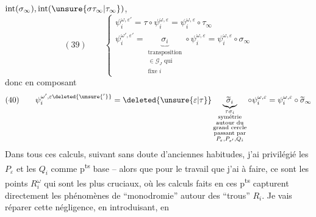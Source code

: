 $\operatorname{int}(\sigma_\infty),\operatorname{int}(\unsure{\sigma\tau_\infty|\tau_\infty})$,
\[
(39)\qquad\begin{cases}
\psi_i^{\omega,\varepsilon'}=\tau\circ\psi_i^{\omega,\varepsilon}=\psi_i^{\omega,\varepsilon}\circ\tau_\infty\\[5pt]
\psi_i^{\omega',\varepsilon'}=\underbrace{\sigma_i}_{\substack{\text{transposition}\\\in\mathcal G_J\text{ qui}\\\text{fixe }i}}\circ\psi_i^{\omega,\varepsilon}=\psi_i^{\omega,\varepsilon}\circ\sigma_\infty
\end{cases}
\]
donc en composant
\[
(40)\qquad\psi_i^{\omega',\varepsilon\deleted{\unsure{'}}}=\deleted{\unsure{\varepsilon|\tau}}\underbrace{\widetilde\sigma_i}_{\substack{\tau\sigma_i\\\text{symétrie}\\\text{autour du}\\\text{grand cercle}\\\text{passant par}\\P_\varepsilon,P_{\varepsilon'},Q_i}}\circ\psi_i^{\omega,\varepsilon}=\psi_i^{\omega,\varepsilon}\circ\widetilde\sigma_\infty
\]
Dans tous ces calculs, suivant sans doute d'anciennes habitudes, j'ai privilégié les $P_\varepsilon$ et les $Q_i$ comme p\textsuperscript{ts} base -- alors que pour le travail que j'ai à faire, ce sont les points $R_i^\omega$ qui sont les plus cruciaux, où les calculs faits en ces p\textsuperscript{ts} capturent directement les phénomènes de ``monodromie'' autour des ``trous'' $R_i$. Je vais réparer cette négligence, en introduisant, en
